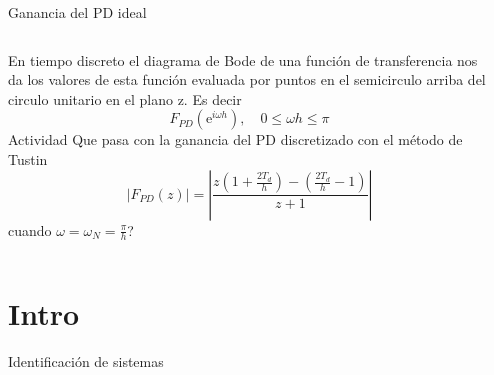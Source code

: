 \documentclass[presentation,aspectratio=169]{beamer}
\begin{document}
\begin{frame}[label={sec:org05ffd24}]{Ganancia del PD ideal}
\begin{columns}
\begin{column}{0.65\columnwidth}
En tiempo discreto el diagrama de Bode de una función de transferencia nos da los valores de esta función evaluada por puntos en el semicirculo arriba del circulo unitario en el plano z. Es decir
\[F_{PD}(\mathrm{e}^{i\omega h}), \quad 0 \le \omega h \le \pi \]
\alert{Actividad} Que pasa con la ganancia del PD discretizado con el método de Tustin \[|F_{PD}(z)| = \left | \frac{z(1 + \frac{2T_d}{h}) - (\frac{2T_d}{h}-1)}{z + 1} \right|\]
cuando \(\omega = \omega_N = \frac{\pi}{h}\)?
\end{column}
\begin{column}{0.35\columnwidth}
\begin{center}
\end{center}
\end{column}
\end{columns}
\end{frame}

\section{Intro}
\label{sec:orgba751c4}
\begin{frame}[label={sec:orga9fa75f}]{Identificación de sistemas}
\end{frame}
\end{document}

